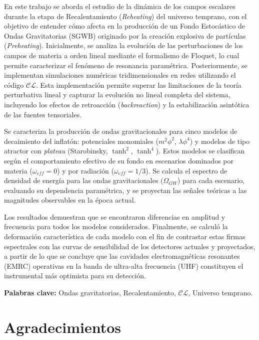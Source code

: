 \documentclass[letterpaper,12pt]{report}
\newcommand{\CosmoLattice}{\ensuremath{\mathcal{C}}\text{osmo}\ensuremath{\mathcal{L}}\text{attice}\xspace}
\begin{document}
En este trabajo se aborda el estudio de la dinámica de los campos escalares durante la etapa de Recalentamiento (\textit{Reheating}) del universo temprano, con el objetivo de entender cómo afecta en la producción de un Fondo Estocástico de Ondas Gravitatorias (SGWB) originado por la creación explosiva de partículas (\textit{Preheating}). Inicialmente, se analiza la evolución de las perturbaciones de los campos de materia a orden lineal mediante el formalismo de Floquet, lo cual permite caracterizar el fenómeno de resonancia paramétrica. Posteriormente, se implementan simulaciones numéricas tridimensionales en redes utilizando el código \CosmoLattice. Esta implementación permite superar las limitaciones de la teoría perturbativa lineal y capturar la evolución no lineal completa del sistema, incluyendo los efectos de retroacción (\textit{backreaction}) y la estabilización asintótica de las fuentes tensoriales.

Se caracteriza la producción de ondas gravitacionales para cinco modelos de decaimiento del inflatón: potenciales monomiales ($m^2\phi^2$, $\lambda\phi^4$) y modelos de tipo atractor con \textit{plateau} (Starobinsky, $\tanh^2$, $\tanh^4$). Estos modelos se clasifican según el comportamiento efectivo de su fondo en escenarios dominados por materia ($\omega_{eff}=0$) y por radiación ($\omega_{eff}=1/3$). Se calcula el espectro de densidad de energía para las ondas gravitacionales ($\Omega_{GW}$) para cada escenario, evaluando su dependencia paramétrica, y se proyectan las señales teóricas a las magnitudes observables en la época actual.

Los resultados demuestran que se encontraron diferencias en amplitud y frecuencia para todos los modelos considerados. Finalmente, se calculó la deformación característica de cada modelo con el fin de contrastar estas firmas espectrales con las curvas de sensibilidad de los detectores actuales y proyectados, a partir de lo que se concluye que las cavidades electromagnéticas resonantes (EMRC) operativas en la banda de ultra-alta frecuencia (UHF) constituyen el instrumental más optimista para su detección.

\vspace{1cm}

\noindent \textbf{Palabras clave:} Ondas gravitatorias, Recalentamiento, \CosmoLattice, Universo temprano.
\newpage

\section*{Agradecimientos}
\end{document}
